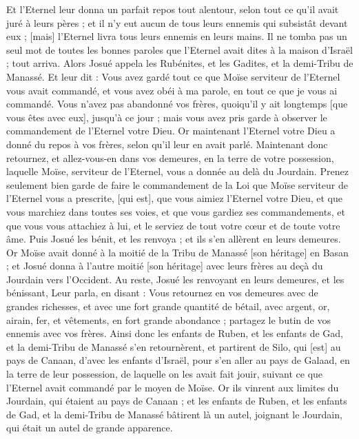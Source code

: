 \begin{multicols}{2}
Et l'Eternel leur donna un parfait repos tout alentour, selon tout ce qu'il avait juré à leurs pères ; et il n'y eut aucun de tous leurs ennemis qui subsistât devant eux ; [mais] l'Eternel livra tous leurs ennemis en leurs mains.
Il ne tomba pas un seul mot de toutes les bonnes paroles que l'Eternel avait dites à la maison d'Israël ; tout arriva.
\VerseOne{}Alors Josué appela les Rubénites, et les Gadites, et la demi-Tribu de Manassé.
Et leur dit : Vous avez gardé tout ce que Moïse serviteur de l'Eternel vous avait commandé, et vous avez obéi à ma parole, en tout ce que je vous ai commandé.
Vous n'avez pas abandonné vos frères, quoiqu'il y ait longtemps [que vous êtes avec eux], jusqu'à ce jour ; mais vous avez pris garde à observer le commandement de l'Eternel votre Dieu.
Or maintenant l'Eternel votre Dieu a donné du repos à vos frères, selon qu'il leur en avait parlé. Maintenant donc retournez, et allez-vous-en dans vos demeures, en la terre de votre possession, laquelle Moïse, serviteur de l'Eternel, vous a donnée au delà du Jourdain.
Prenez seulement bien garde de faire le commandement de la Loi que Moïse serviteur de l'Eternel vous a prescrite, [qui est], que vous aimiez l'Eternel votre Dieu, et que vous marchiez dans toutes ses voies, et que vous gardiez ses commandements, et que vous vous attachiez à lui, et le serviez de tout votre cœur et de toute votre âme.
Puis Josué les bénit, et les renvoya ; et ils s'en allèrent en leurs demeures.
Or Moïse avait donné à la moitié de la Tribu de Manassé [son héritage] en Basan ; et Josué donna à l'autre moitié [son héritage] avec leurs frères au deçà du Jourdain vers l'Occident. Au reste, Josué les renvoyant en leurs demeures, et les bénissant,
Leur parla, en disant : Vous retournez en vos demeures avec de grandes richesses, et avec une fort grande quantité de bétail, avec argent, or, airain, fer, et vêtements, en fort grande abondance ; partagez le butin de vos ennemis avec vos frères.
Ainsi donc les enfants de Ruben, et les enfants de Gad, et la demi-Tribu de Manassé s'en retournèrent, et partirent de Silo, qui [est] au pays de Canaan, d'avec les enfants d'Israël, pour s'en aller au pays de Galaad, en la terre de leur possession, de laquelle on les avait fait jouir, suivant ce que l'Eternel avait commandé par le moyen de Moïse.
Or ils vinrent aux limites du Jourdain, qui étaient au pays de Canaan ; et les enfants de Ruben, et les enfants de Gad, et la demi-Tribu de Manassé bâtirent là un autel, joignant le Jourdain, qui était un autel de grande apparence.

\end{multicols}
